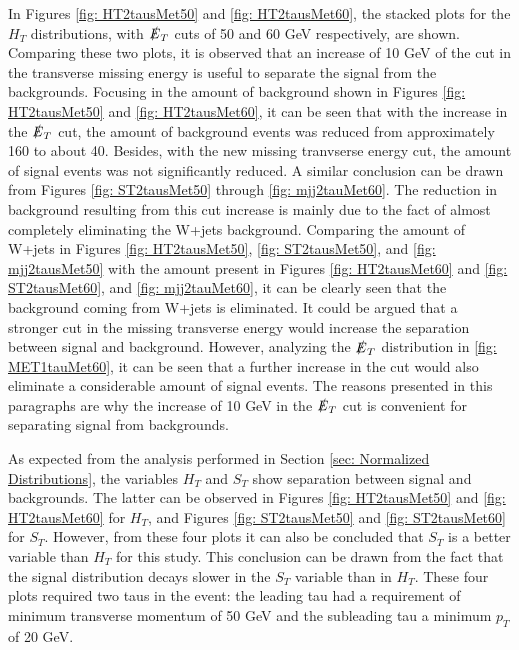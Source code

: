 In Figures \ref{fig: HT2tausMet50} and \ref{fig: HT2tausMet60}, the stacked plots for the $H_{T}$ distributions, with $\slashed{E}_{T}$ cuts of 50 and 60 GeV respectively, are shown. Comparing these two plots, it is observed that an increase of 10 GeV of the cut in the transverse missing energy is useful to separate the signal from the backgrounds. Focusing in the amount of background shown in Figures \ref{fig: HT2tausMet50} and \ref{fig: HT2tausMet60}, it can be seen that with the increase in the $\slashed{E}_{T}$ cut, the amount of background events was reduced from approximately 160 to about 40. Besides, with the new missing tranvserse energy cut, the amount of signal events was not significantly reduced. A similar conclusion can be drawn from Figures \ref{fig: ST2tausMet50} through \ref{fig: mjj2tauMet60}. The reduction in background resulting from this cut increase is mainly due to the fact of almost completely eliminating the W+jets background. Comparing the amount of W+jets in Figures \ref{fig: HT2tausMet50}, \ref{fig: ST2tausMet50}, and \ref{fig: mjj2tausMet50} with the amount present in Figures \ref{fig: HT2tausMet60} and \ref{fig: ST2tausMet60}, and \ref{fig: mjj2tauMet60}, it can be clearly seen that the background coming from W+jets is eliminated. It could be argued that a stronger cut in the missing transverse energy would increase the separation between signal and background. However, analyzing the $\slashed{E}_{T}$ distribution in \ref{fig: MET1tauMet60}, it can be seen that a further increase in the cut would also eliminate a considerable amount of signal events. The reasons presented in this paragraphs are why the increase of 10 GeV in the $\slashed{E}_{T}$ cut is convenient for separating signal from backgrounds.

As expected from the analysis performed in Section \ref{sec: Normalized Distributions}, the variables $H_{T}$ and $S_{T}$ show separation between signal and backgrounds. The latter can be observed in Figures \ref{fig: HT2tausMet50} and \ref{fig: HT2tausMet60} for $H_{T}$, and Figures \ref{fig: ST2tausMet50} and \ref{fig: ST2tausMet60} for $S_{T}$. However, from these four plots it can also be concluded that $S_{T}$ is a better variable than $H_{T}$ for this study. This conclusion can be drawn from the fact that the signal distribution decays slower in the $S_{T}$ variable than in $H_{T}$. These four plots required two taus in the event: the leading tau had a requirement of minimum transverse momentum of 50 GeV and the subleading tau a minimum $p_{T}$ of 20 GeV.


